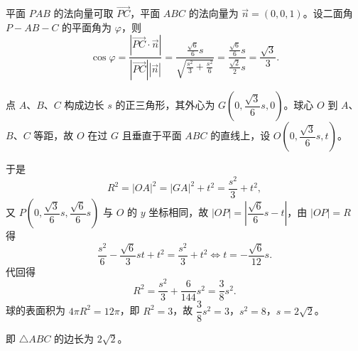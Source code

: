 \begin{answer}

平面 $PAB$ 的法向量可取 $\overrightarrow{PC}$，平面 $ABC$ 的法向量为 $\vec{n} = (0,0,1)$。设二面角 $P-AB-C$ 的平面角为 $\varphi$，则
\nopagebreak[4]
\[
\cos\varphi = \frac{\left|\overrightarrow{PC} \cdot \vec{n}\right|}{\left|\overrightarrow{PC}\right|\left|\vec{n}\right|} = \frac{\frac{\sqrt{6}}{6}s}{\sqrt{\frac{s^2}{3} + \frac{s^2}{6}}} = \frac{\frac{\sqrt{6}}{6}s}{\frac{\sqrt{2}}{2}s} = \frac{\sqrt{3}}{3}.
\]


点 $A$、$B$、$C$ 构成边长 $s$ 的正三角形，其外心为 $G\left(0, \dfrac{\sqrt{3}}{6}s, 0\right)$。球心 $O$ 到 $A$、$B$、$C$ 等距，故 $O$ 在过 $G$ 且垂直于平面 $ABC$ 的直线上，设 $O(0, \dfrac{\sqrt{3}}{6}s, t)$。

于是
\nopagebreak[4]
\[
R^2 = |OA|^2 = |GA|^2 + t^2 = \frac{s^2}{3} + t^2,
\]
又 $P\left(0, \dfrac{\sqrt{3}}{6}s, \dfrac{\sqrt{6}}{6}s\right)$ 与 $O$ 的 $y$ 坐标相同，故 $|OP| = \left|\dfrac{\sqrt{6}}{6}s - t\right|$，由 $|OP| = R$ 得
\nopagebreak[4]
\[
\frac{s^2}{6} - \frac{\sqrt{6}}{3}st + t^2 = \frac{s^2}{3} + t^2 \iff t = -\frac{\sqrt{6}}{12}s.
\]
代回得
\nopagebreak[4]
\[
R^2 = \frac{s^2}{3} + \frac{6}{144}s^2 = \frac{3}{8}s^2.
\]
球的表面积为 $4\pi R^2 = 12\pi$，即 $R^2 = 3$，故 $\dfrac{3}{8}s^2 = 3$，$s^2 = 8$，$s = 2\sqrt{2}$。

即 $\triangle ABC$ 的边长为 $2\sqrt{2}$。




\end{answer}
